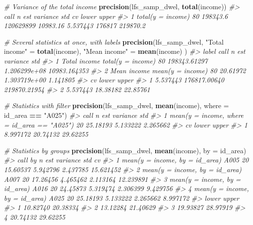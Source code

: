 \documentclass[
]{article}
\newenvironment{Shaded}{\begin{snugshade}}{\end{snugshade}}
\newcommand{\AttributeTok}[1]{\textcolor[rgb]{0.13,0.29,0.53}{#1}}
\newcommand{\CommentTok}[1]{\textcolor[rgb]{0.56,0.35,0.01}{\textit{#1}}}
\newcommand{\FunctionTok}[1]{\textcolor[rgb]{0.13,0.29,0.53}{\textbf{#1}}}
\newcommand{\NormalTok}[1]{#1}
\newcommand{\OtherTok}[1]{\textcolor[rgb]{0.56,0.35,0.01}{#1}}
\newcommand{\SpecialCharTok}[1]{\textcolor[rgb]{0.81,0.36,0.00}{\textbf{#1}}}
\newcommand{\StringTok}[1]{\textcolor[rgb]{0.31,0.60,0.02}{#1}}
\begin{document}
\begin{Shaded}
\begin{Highlighting}[]
\CommentTok{\# Variance of the total income}
\FunctionTok{precision}\NormalTok{(lfs\_samp\_dwel, }\FunctionTok{total}\NormalTok{(income))}
\CommentTok{\#\textgreater{}                call  n      est  variance      std       cv  lower    upper}
\CommentTok{\#\textgreater{} 1 total(y = income) 80 198343.6 120629899 10983.16 5.537443 176817 219870.2}

\CommentTok{\# Several statistics at once, with labels}
\FunctionTok{precision}\NormalTok{(lfs\_samp\_dwel,}
  \StringTok{"Total income"} \OtherTok{=} \FunctionTok{total}\NormalTok{(income),}
  \StringTok{"Mean income"}  \OtherTok{=} \FunctionTok{mean}\NormalTok{(income)}
\NormalTok{)}
\CommentTok{\#\textgreater{}          label              call  n          est     variance          std}
\CommentTok{\#\textgreater{} 1 Total income total(y = income) 80 198343.61297 1.206299e+08 10983.164353}
\CommentTok{\#\textgreater{} 2  Mean income  mean(y = income) 80     20.61972 1.303719e+00     1.141805}
\CommentTok{\#\textgreater{}         cv        lower        upper}
\CommentTok{\#\textgreater{} 1 5.537443 176817.00640 219870.21954}
\CommentTok{\#\textgreater{} 2 5.537443     18.38182     22.85761}

\CommentTok{\# Statistics with filter}
\FunctionTok{precision}\NormalTok{(lfs\_samp\_dwel, }\FunctionTok{mean}\NormalTok{(income), }\AttributeTok{where =}\NormalTok{ id\_area }\SpecialCharTok{==} \StringTok{"A025"}\NormalTok{)}
\CommentTok{\#\textgreater{}                                          call  n      est variance      std}
\CommentTok{\#\textgreater{} 1 mean(y = income, where = id\_area == "A025") 20 25.18193 5.133222 2.265662}
\CommentTok{\#\textgreater{}         cv    lower    upper}
\CommentTok{\#\textgreater{} 1 8.997172 20.74132 29.62255}

\CommentTok{\# Statistics by groups}
\FunctionTok{precision}\NormalTok{(lfs\_samp\_dwel, }\FunctionTok{mean}\NormalTok{(income), }\AttributeTok{by =}\NormalTok{ id\_area)}
\CommentTok{\#\textgreater{}                             call   by  n      est variance      std        cv}
\CommentTok{\#\textgreater{} 1 mean(y = income, by = id\_area) A005 20 15.60537 5.942796 2.437785 15.621452}
\CommentTok{\#\textgreater{} 2 mean(y = income, by = id\_area) A007 20 17.26456 4.465462 2.113164 12.239891}
\CommentTok{\#\textgreater{} 3 mean(y = income, by = id\_area) A016 20 24.45873 5.319474 2.306399  9.429756}
\CommentTok{\#\textgreater{} 4 mean(y = income, by = id\_area) A025 20 25.18193 5.133222 2.265662  8.997172}
\CommentTok{\#\textgreater{}      lower    upper}
\CommentTok{\#\textgreater{} 1 10.82740 20.38334}
\CommentTok{\#\textgreater{} 2 13.12284 21.40629}
\CommentTok{\#\textgreater{} 3 19.93827 28.97919}
\CommentTok{\#\textgreater{} 4 20.74132 29.62255}
\end{Highlighting}
\end{Shaded}
\end{document}
